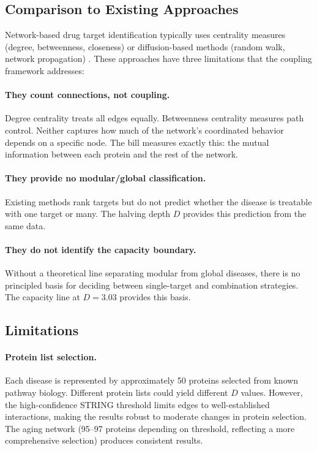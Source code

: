 \documentclass[11pt,a4paper]{article}
\begin{document}
\subsection{Comparison to Existing Approaches}

Network-based drug target identification typically uses centrality measures (degree, betweenness, closeness) or diffusion-based methods (random walk, network propagation) \citep{barabasi2011,cheng2018,menche2015}. These approaches have three limitations that the coupling framework addresses:

\paragraph{They count connections, not coupling.} Degree centrality treats all edges equally. Betweenness centrality measures path control. Neither captures how much of the network's coordinated behavior depends on a specific node. The bill measures exactly this: the mutual information between each protein and the rest of the network.

\paragraph{They provide no modular/global classification.} Existing methods rank targets but do not predict whether the disease is treatable with one target or many. The halving depth $D$ provides this prediction from the same data.

\paragraph{They do not identify the capacity boundary.} Without a theoretical line separating modular from global diseases, there is no principled basis for deciding between single-target and combination strategies. The capacity line at $D = 3.03$ provides this basis.

\subsection{Limitations}

\paragraph{Protein list selection.} Each disease is represented by approximately 50 proteins selected from known pathway biology. Different protein lists could yield different $D$ values. However, the high-confidence STRING threshold limits edges to well-established interactions, making the results robust to moderate changes in protein selection. The aging network (95--97 proteins depending on threshold, reflecting a more comprehensive selection) produces consistent results.
\end{document}
